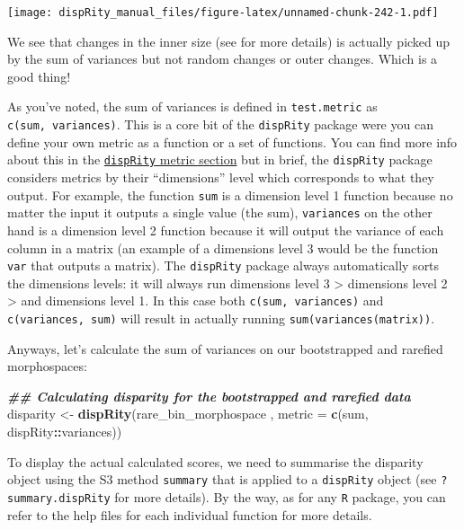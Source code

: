 \documentclass[
]{book}
\newenvironment{Shaded}{\begin{snugshade}}{\end{snugshade}}
\newcommand{\AttributeTok}[1]{\textcolor[rgb]{0.13,0.29,0.53}{#1}}
\newcommand{\DocumentationTok}[1]{\textcolor[rgb]{0.56,0.35,0.01}{\textbf{\textit{#1}}}}
\newcommand{\FunctionTok}[1]{\textcolor[rgb]{0.13,0.29,0.53}{\textbf{#1}}}
\newcommand{\NormalTok}[1]{#1}
\newcommand{\OtherTok}[1]{\textcolor[rgb]{0.56,0.35,0.01}{#1}}
\newcommand{\SpecialCharTok}[1]{\textcolor[rgb]{0.81,0.36,0.00}{\textbf{#1}}}
\begin{document}
\texttt{[image: dispRity\_manual\_files/figure-latex/unnamed-chunk-242-1.pdf]}

We see that changes in the inner size (see \citet{moms} for more details) is actually picked up by the sum of variances but not random changes or outer changes. Which is a good thing!

As you've noted, the sum of variances is defined in \texttt{test.metric} as \texttt{c(sum,\ variances)}. This is a core bit of the \texttt{dispRity} package were you can define your own metric as a function or a set of functions.
You can find more info about this in the \protect\hyperlink{disparity-metrics}{\texttt{dispRity} metric section} but in brief, the \texttt{dispRity} package considers metrics by their ``dimensions'' level which corresponds to what they output. For example, the function \texttt{sum} is a dimension level 1 function because no matter the input it outputs a single value (the sum), \texttt{variances} on the other hand is a dimension level 2 function because it will output the variance of each column in a matrix (an example of a dimensions level 3 would be the function \texttt{var} that outputs a matrix).
The \texttt{dispRity} package always automatically sorts the dimensions levels: it will always run dimensions level 3 \textgreater{} dimensions level 2 \textgreater{} and dimensions level 1. In this case both \texttt{c(sum,\ variances)} and \texttt{c(variances,\ sum)} will result in actually running \texttt{sum(variances(matrix))}.

Anyways, let's calculate the sum of variances on our bootstrapped and rarefied morphospaces:

\begin{Shaded}
\begin{Highlighting}[]
\DocumentationTok{\#\# Calculating disparity for the bootstrapped and rarefied data}
\NormalTok{disparity }\OtherTok{\textless{}{-}} \FunctionTok{dispRity}\NormalTok{(rare\_bin\_morphospace , }\AttributeTok{metric =} \FunctionTok{c}\NormalTok{(sum, dispRity}\SpecialCharTok{::}\NormalTok{variances))}
\end{Highlighting}
\end{Shaded}

To display the actual calculated scores, we need to summarise the disparity object using the S3 method \texttt{summary} that is applied to a \texttt{dispRity} object (see \texttt{?summary.dispRity} for more details).
By the way, as for any \texttt{R} package, you can refer to the help files for each individual function for more details.
\end{document}
